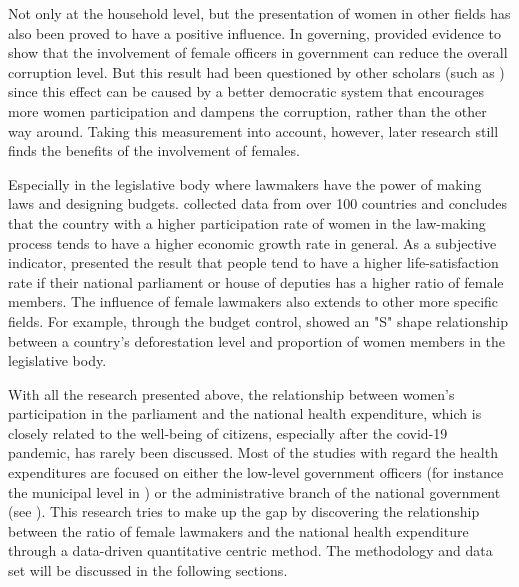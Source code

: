 \documentclass[12pt]{article}
\begin{document}
Not only at the household level, but the presentation of women in other fields has also been proved to have a positive influence.
In governing,  provided evidence to show that the involvement of female officers in government can reduce the overall corruption level.
But this result had been questioned by other scholars (such as ) since this effect can be caused by a better democratic system that encourages more women participation and dampens the corruption, rather than the other way around. 
Taking this measurement into account, however, later research still finds the benefits of the involvement of females.

Especially in the legislative body where lawmakers have the power of making laws and designing budgets.
 collected data from over 100 countries and concludes that the country with a higher participation rate of women in the law-making process tends to have a higher economic growth rate in general.
As a subjective indicator,  presented the result that people tend to have a higher life-satisfaction rate if their national parliament or house of deputies has a higher ratio of female members.  
The influence of female lawmakers also extends to other more specific fields.
For example, through the budget control,  showed an "S" shape relationship between a country's deforestation level and proportion of women members in the legislative body. 

With all the research presented above, the relationship between women's participation in the parliament and the national health expenditure, which is closely related to the well-being of citizens, especially after the covid-19 pandemic, has rarely been discussed. 
Most of the studies with regard the health expenditures are focused on either the low-level government officers (for instance the municipal level in ) or the administrative branch of the national government (see ).
This research tries to make up the gap by discovering the relationship between the ratio of female lawmakers and the national health expenditure through a data-driven quantitative centric method.
The methodology and data set will be discussed in the following sections.
\end{document}
